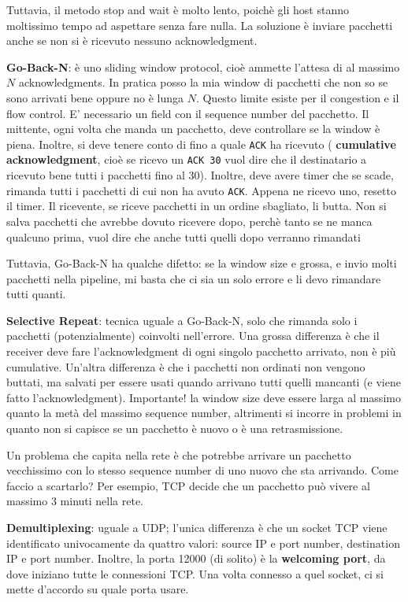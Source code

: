 \documentclass[a4paper,10pt]{article} %
\renewcommand{\b}[1]{%
    {\textbf{#1}}}
\renewcommand{\t}[1]{%
    {\texttt{#1}}}
\begin{document}
Tuttavia, il metodo stop and wait è molto lento, poichè gli host stanno moltissimo tempo ad aspettare senza fare nulla. La soluzione è inviare pacchetti anche se non si è ricevuto nessuno acknowledgment.

\b{Go-Back-N}: è uno sliding window protocol, cioè ammette l'attesa di al massimo $N$ acknowledgments. In pratica posso la mia window di pacchetti che non so se sono arrivati bene oppure no è lunga $N$. Questo limite esiste per il congestion e il flow control. E' necessario un field con il sequence number del pacchetto. Il mittente, ogni volta che manda un pacchetto, deve controllare se la window è piena. Inoltre, si deve tenere conto di fino a quale \t{ACK} ha ricevuto (\b{cumulative acknowledgment}, cioè se ricevo un \t{ACK 30} vuol dire che il destinatario a ricevuto bene tutti i pacchetti fino al 30). Inoltre, deve avere timer che se scade, rimanda tutti i pacchetti di cui non ha avuto \t{ACK}. Appena ne ricevo uno, resetto il timer. Il ricevente, se riceve pacchetti in un ordine sbagliato, li butta. Non si salva pacchetti che avrebbe dovuto ricevere dopo, perchè tanto se ne manca qualcuno prima, vuol dire che anche tutti quelli dopo verranno rimandati

Tuttavia, Go-Back-N ha qualche difetto: se la window size e grossa, e invio molti pacchetti nella pipeline, mi basta che ci sia un solo errore e li devo rimandare tutti quanti.

\b{Selective Repeat}: tecnica uguale a Go-Back-N, solo che rimanda solo i pacchetti (potenzialmente) coinvolti nell'errore. Una grossa differenza è che il receiver deve fare l'acknowledgment di ogni singolo pacchetto arrivato, non è più cumulative. Un'altra differenza è che i pacchetti non ordinati non vengono buttati, ma salvati per essere usati quando arrivano tutti quelli mancanti (e viene fatto l'acknowledgment). Importante! la window size deve essere larga al massimo quanto la metà del massimo sequence number, altrimenti si incorre in problemi in quanto non si capisce se un pacchetto è nuovo o è una retrasmissione.

Un problema che capita nella rete è che potrebbe arrivare un pacchetto vecchissimo con lo stesso sequence number di uno nuovo che sta arrivando. Come faccio a scartarlo? Per esempio, TCP decide che un pacchetto può vivere al massimo 3 minuti nella rete.

\b{Demultiplexing}: uguale a UDP; l'unica differenza è che un socket TCP viene identificato univocamente da quattro valori: source IP e port number, destination IP e port number. Inoltre, la porta 12000 (di solito) è la \b{welcoming port}, da dove iniziano tutte le connessioni TCP. Una volta connesso a quel socket, ci si mette d'accordo su quale porta usare.
\end{document}
